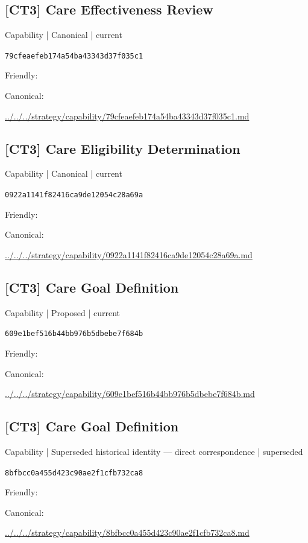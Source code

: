 \documentclass[10pt,a4paper]{article}
\begin{document}
\subsection*{[CT3] Care Effectiveness Review}
{\small Capability | Canonical | current}\par
\texttt{79cfeaefeb174a54ba43343d37f035c1}\par
Friendly: \par
Canonical: \par
{\footnotesize\url{../../../strategy/capability/79cfeaefeb174a54ba43343d37f035c1.md}}\par
\subsection*{[CT3] Care Eligibility Determination}
{\small Capability | Canonical | current}\par
\texttt{0922a1141f82416ca9de12054c28a69a}\par
Friendly: \par
Canonical: \par
{\footnotesize\url{../../../strategy/capability/0922a1141f82416ca9de12054c28a69a.md}}\par
\subsection*{[CT3] Care Goal Definition}
{\small Capability | Proposed | current}\par
\texttt{609e1bef516b44bb976b5dbebe7f684b}\par
Friendly: \par
Canonical: \par
{\footnotesize\url{../../../strategy/capability/609e1bef516b44bb976b5dbebe7f684b.md}}\par
\subsection*{[CT3] Care Goal Definition}
{\small Capability | Superseded historical identity — direct correspondence | superseded}\par
\texttt{8bfbcc0a455d423c90ae2f1cfb732ca8}\par
Friendly: \par
Canonical: \par
{\footnotesize\url{../../../strategy/capability/8bfbcc0a455d423c90ae2f1cfb732ca8.md}}\par
\end{document}
